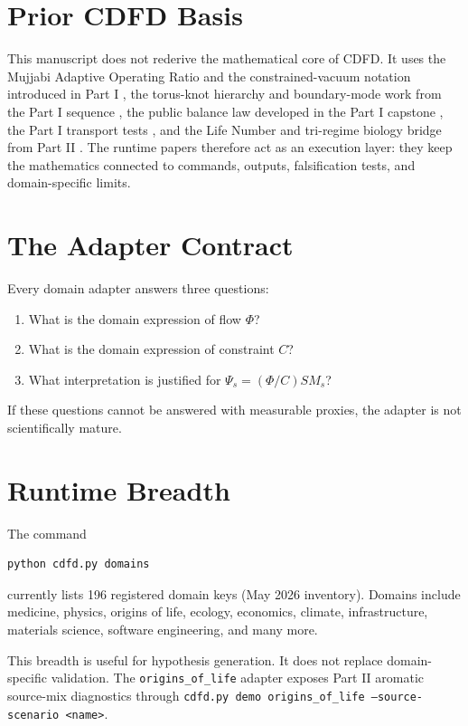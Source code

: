 \documentclass[12pt,a4paper]{article}
\begin{document}
\section{Prior CDFD Basis}
This manuscript does not rederive the mathematical core of CDFD. It uses the
Mujjabi Adaptive Operating Ratio and the constrained-vacuum notation introduced
in Part I \cite{MujjabiI2026}, the torus-knot hierarchy and boundary-mode work
from the Part I sequence \cite{MujjabiVI2026,MujjabiIX2026}, the public balance
law developed in the Part I capstone \cite{MujjabiX2026}, the Part I transport
tests \cite{MujjabiXII2026}, and the Life Number and tri-regime biology bridge
from Part II \cite{MujjabiPartII2026}. The runtime papers therefore act as an
execution layer: they keep the mathematics connected to commands, outputs,
falsification tests, and domain-specific limits.


\section{The Adapter Contract}
Every domain adapter answers three questions:
\begin{enumerate}
    \item What is the domain expression of flow $\Phi$?
    \item What is the domain expression of constraint $C$?
    \item What interpretation is justified for $\Psi_s=(\Phi/C)S M_s$?
\end{enumerate}
If these questions cannot be answered with measurable proxies, the adapter is
not scientifically mature.

\section{Runtime Breadth}
The command
\begin{verbatim}
python cdfd.py domains
\end{verbatim}
currently lists 196 registered domain keys (May 2026 inventory). Domains include
medicine, physics, origins of life, ecology, economics, climate, infrastructure,
materials science, software engineering, and many more.

This breadth is useful for hypothesis generation. It does not replace
domain-specific validation. The \texttt{origins\_of\_life} adapter exposes
Part II aromatic source-mix diagnostics through
\texttt{cdfd.py demo origins\_of\_life --source-scenario <name>}.
\end{document}
